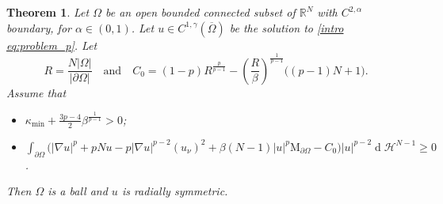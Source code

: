 \documentclass[10pt,a4paper, reqno]{amsart}
\numberwithin{equation}{section}
\newcommand{\R}{\mathbb{R}}
\newtheorem{teo}{Theorem}[section]
\renewcommand{\d}[1]{\ensuremath{\operatorname{d}\!{#1}}}
\begin{document}
\begin{teo}\label{thm rigidity serrin integral}
    Let $\Omega$ be an open bounded connected subset of $\R^N$ with $C^{2,\alpha}$ boundary, for $\alpha \in (0,1)$. Let $u \in C^{1,\gamma}(\overline{\Omega})$ be the solution to \eqref{intro eq:problem_p}. Let 
    \begin{equation*}
        R = \frac{N|\Omega|}{|\partial\Omega|} \quad \text{and} \quad  C_0 = (1-p)R^{\frac{p}{p-1}} - \left( \frac{R}{\beta} \right)^{\frac{1}{p-1}} \big( (p-1)N + 1 \big). 
    \end{equation*}
    Assume that 
    \begin{itemize}
            \item[(i)]  $\kappa_{\min} +  \frac{3p-4}{2} \beta^{\frac{1}{p-1}} > 0$;
    
            \item[(ii)] $\displaystyle \int_{\partial\Omega} \Big( |\nabla u|^p + pNu - p |\nabla u|^{p-2} (u_\nu)^2 + \beta(N-1) |u|^p \mathrm{M}_{\partial\Omega}  - C_0 \Big) |u|^{p-2} \d{}\mathcal{H}^{N-1} \geq 0$.
    \end{itemize}
    Then $\Omega$ is a ball and $u$ is radially symmetric.
\end{teo}
\end{document}
